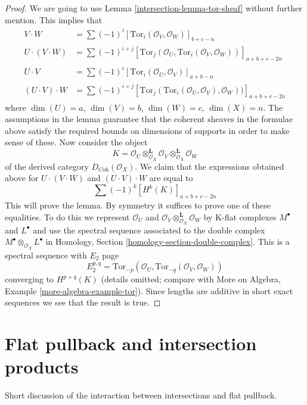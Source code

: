 \begin{proof}

We are going to use Lemma \ref{intersection-lemma-tor-sheaf} without further mention.
This implies that
\begin{align*}
V \cdot W
& =
\sum (-1)^i [\text{Tor}_i(\mathcal{O}_V, \mathcal{O}_W)]_{b + c - n} \\
U \cdot (V \cdot W)
& =
\sum (-1)^{i + j}
[
\text{Tor}_j(\mathcal{O}_U, \text{Tor}_i(\mathcal{O}_V, \mathcal{O}_W))
]_{a + b + c - 2n} \\
U \cdot V
& =
\sum (-1)^i [\text{Tor}_i(\mathcal{O}_U, \mathcal{O}_V)]_{a + b - n} \\
(U \cdot V) \cdot W
& =
\sum (-1)^{i + j}
[
\text{Tor}_j(\text{Tor}_i(\mathcal{O}_U, \mathcal{O}_V), \mathcal{O}_W))
]_{a + b + c - 2n}
\end{align*}
where $\dim(U) = a$, $\dim(V) = b$, $\dim(W) = c$, $\dim(X) = n$.
The assumptions in the lemma guarantee that the coherent sheaves
in the formulae above satisfy the required bounds on dimensions
of supports in order to make sense of these. Now consider the object
$$
K =
\mathcal{O}_U \otimes^\mathbf{L}_{\mathcal{O}_X} \mathcal{O}_V
\otimes^\mathbf{L}_{\mathcal{O}_X} \mathcal{O}_W
$$
of the derived category $D_{\textit{Coh}}(\mathcal{O}_X)$.
We claim that the expressions obtained above for
$U \cdot (V \cdot W)$ and $(U \cdot V) \cdot W$
are equal to
$$
\sum (-1)^k [H^k(K)]_{a + b + c - 2n}
$$
This will prove the lemma. By symmetry it suffices to prove one
of these equalities. To do this we represent $\mathcal{O}_U$
and $\mathcal{O}_V \otimes_{\mathcal{O}_X}^\mathbf{L} \mathcal{O}_W$
by K-flat complexes $M^\bullet$ and $L^\bullet$ and use the
spectral sequence associated to the double complex
$M^\bullet \otimes_{\mathcal{O}_X} L^\bullet$ in
Homology, Section \ref{homology-section-double-complex}.
This is a spectral sequence with $E_2$ page
$$
E_2^{p, q} =
\text{Tor}_{-p}(\mathcal{O}_U, \text{Tor}_{-q}(\mathcal{O}_V, \mathcal{O}_W))
$$
converging to $H^{p + q}(K)$ (details omitted; compare with
More on Algebra, Example \ref{more-algebra-example-tor}).
Since lengths are additive in short
exact sequences we see that the result is true.
\end{proof}

\section{Flat pullback and intersection products}
\label{intersection-section-flat-pullback-and-intersection-products}
Short discussion of the interaction between intersections and
flat pullback.

